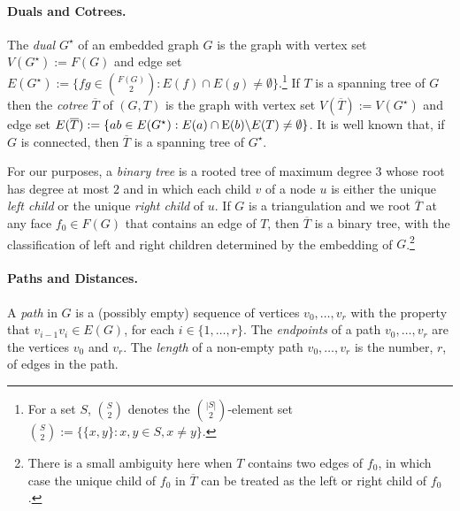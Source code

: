 \documentclass[a4paper,UKenglish,autoref]{lipics-v2021}
\DeclareMathOperator{\dist}{dist}
\begin{document}
\paragraph{Duals and Cotrees.}

The \emph{dual} $G^\star$ of an embedded graph $G$ is the graph with vertex set $V(G^\star):=F(G)$ and edge set $E(G^{\star}):=\{fg\in \binom{F(G)}{2}:E(f)\cap E(g)\neq\emptyset\}$.\footnote{For a set $S$, $\binom{S}{2}$ denotes the $\binom{|S|}{2}$-element set $\binom{S}{2}:=\{\{x,y\}:x,y\in S, x\neq y\}$.} If $T$ is a spanning tree of $G$ then the \emph{cotree} $\overline{T}$ of $(G,T)$ is the graph with vertex set $V(\overline{T}) := V(G^\star)$ and edge set $E(\overline{T}) := \{ab \in E(G^\star) : E(a) \cap \mathrm{E}(b) \backslash E(T) \neq \emptyset \}$. It is well known that, if $G$ is connected, then $\overline{T}$ is a spanning tree of $G^\star$.

For our purposes, a \emph{binary tree} is a rooted tree of maximum degree $3$ whose root has degree at most $2$ and in which each child $v$ of a node $u$ is either the unique \emph{left child} or the unique \emph{right child} of $u$.  If $G$ is a triangulation  and we root $\overline{T}$ at any face $f_0\in F(G)$ that contains an edge of $T$, then $\overline{T}$ is a binary tree, with the classification of left and right children determined by the embedding of $G$.\footnote{There is a small ambiguity here when $T$ contains two edges of $f_0$, in which case the unique child of $f_0$ in $\overline{T}$ can be treated as the left or right child of $f_0$.}


\paragraph{Paths and Distances.}

A \emph{path} in $G$ is a (possibly empty) sequence of vertices $v_0,\ldots,v_r$ with the property that $v_{i-1}v_i\in E(G)$, for each $i\in\{1,\ldots,r\}$.  The \emph{endpoints} of a path $v_0,\ldots,v_r$ are the vertices $v_0$ and $v_r$.
The \emph{length} of a non-empty path $v_0,\ldots,v_r$ is the number, $r$, of edges in the path.
%
\end{document}

